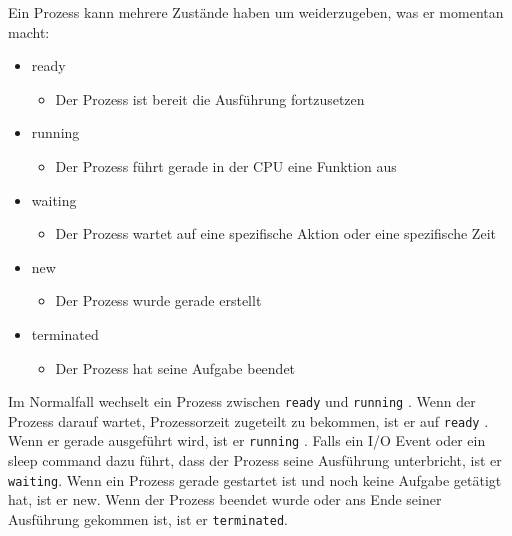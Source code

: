 \documentclass{article}
\begin{document}
	Ein Prozess kann mehrere Zustände haben um weiderzugeben, was er momentan macht:
	\begin{itemize}
		\item{ready}
		\begin{itemize}
			\item{Der Prozess ist bereit die Ausführung fortzusetzen}
		\end{itemize}
		\item{running}
		\begin{itemize}
			\item{Der Prozess führt gerade in der CPU eine Funktion aus}
		\end{itemize}
		\item{waiting}
		\begin{itemize}
			\item{Der Prozess wartet auf eine spezifische Aktion oder eine spezifische Zeit}
		\end{itemize}
		\item{new}
		\begin{itemize}
			\item{Der Prozess wurde gerade erstellt}
		\end{itemize}
		\item{terminated}
		\begin{itemize}
			\item{Der Prozess hat seine Aufgabe beendet}
		\end{itemize}
	\end{itemize}
	Im Normalfall wechselt ein Prozess zwischen \verb|ready|  und \verb|running| . Wenn der Prozess darauf wartet, Prozessorzeit zugeteilt zu bekommen, ist er auf \verb|ready| . Wenn er gerade ausgeführt wird, ist er \verb|running| . Falls ein I/O Event oder ein sleep command dazu führt, dass der Prozess seine Ausführung unterbricht, ist er \verb|waiting|. Wenn ein Prozess gerade gestartet ist und noch keine Aufgabe getätigt hat, ist er new. Wenn der Prozess beendet wurde oder ans Ende seiner Ausführung gekommen ist, ist er \verb|terminated|. 
\end{document}
